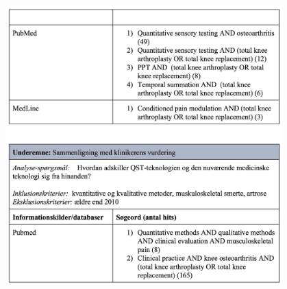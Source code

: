 \begin{center}
\includegraphics[width=0.8\textwidth]{rapportAfsnit/qBilag/sogninger/TEC2}
\end{center}

